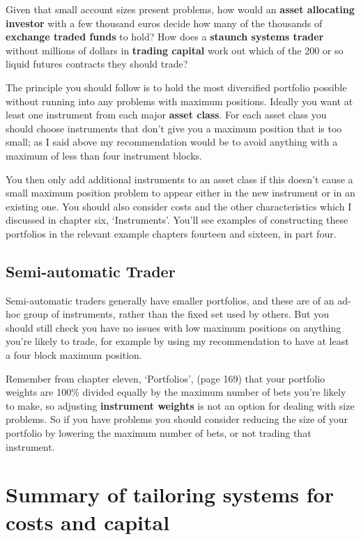 Given that small account sizes present problems, how would an \textbf{asset allocating investor} with a few thousand euros decide how many of the thousands of \textbf{exchange traded funds} to hold? How does a \textbf{staunch systems trader} without millions of dollars in \textbf{trading capital} work out which of the 200 or so liquid futures contracts they should trade?

The principle you should follow is to hold the most diversified portfolio possible without running into any problems with maximum positions. Ideally you want at least one instrument from each major \textbf{asset class}. For each asset class you should choose instruments that don't give you a maximum position that is too small; as I said above my recommendation would be to avoid anything with a maximum of less than four instrument blocks.

You then only add additional instruments to an asset class if this doesn't cause a small maximum position problem to appear either in the new instrument or in an existing one. You should also consider costs and the other characteristics which I discussed in chapter six, ‘Instruments'. You'll see examples of constructing these portfolios in the relevant example chapters fourteen and sixteen, in part four.

\subsection*{Semi-automatic Trader}

Semi-automatic traders generally have smaller portfolios, and these are of an ad-hoc group of instruments, rather than the fixed set used by others. But you should still check you have no issues with low maximum positions on anything you're likely to trade, for example by using my recommendation to have at least a four block maximum position.

Remember from chapter eleven, ‘Portfolios', (page 169) that your portfolio weights are 100\% divided equally by the maximum number of bets you're likely to make, so adjusting \textbf{instrument weights} is not an option for dealing with size problems. So if you have problems you should consider reducing the size of your portfolio by lowering the maximum number of bets, or not trading that instrument.

\section*{Summary of tailoring systems for costs and capital}  {}

